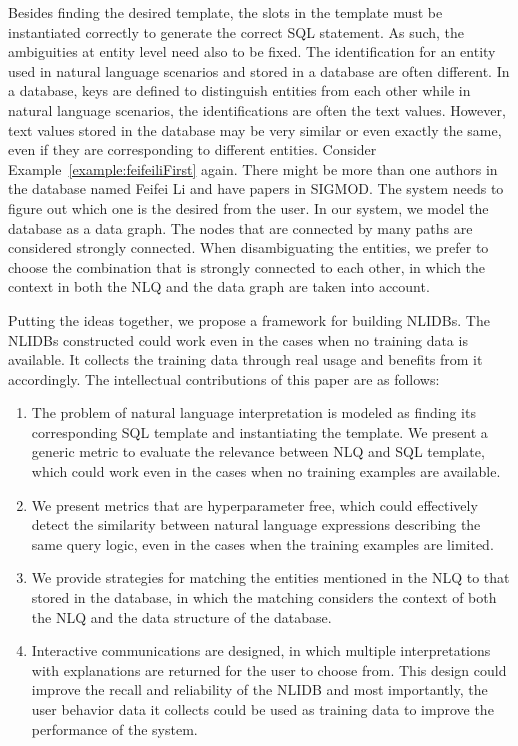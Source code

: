 \documentclass{vldb}
\begin{document}
Besides finding the desired template, the slots in the template must be instantiated correctly to generate the correct SQL statement. As such, the ambiguities at entity level need also to be fixed. The identification for an entity used in natural language scenarios and stored in a database are often different. In a database, keys are defined to distinguish entities from each other while in natural language scenarios, the identifications are often the text values. However, text values stored in the database may be very similar or even exactly the same, even if they are corresponding to different entities. Consider Example~\ref{example:feifeiliFirst} again.  There might be more than one authors in the database named Feifei Li and have papers in SIGMOD. The system needs to figure out which one is the desired from the user.  In our system, we model the database as a data graph. The nodes that are connected by many paths are considered strongly connected. When disambiguating the entities, we prefer to choose the combination that is strongly connected to each other, in which the context in both the NLQ and the data graph are taken into account. 

Putting the ideas together, we propose a framework for building NLIDBs.  The NLIDBs constructed could work even in the cases when no training data is available.  It collects the training data through real usage and benefits from it accordingly.  The intellectual contributions of this paper are as follows: 
\begin{enumerate}
  \item The problem of natural language interpretation is modeled as finding its corresponding SQL template and instantiating the template.  We present a generic metric to evaluate the relevance between NLQ and SQL template, which could work even in the cases when no training examples are available.  
   \item We present metrics that are hyperparameter free, which could effectively detect the similarity between natural language expressions describing the same query logic, even in the cases when the training examples are limited.  
  \item We provide strategies for matching the entities mentioned in the NLQ to that stored in the database, in which the matching considers the context of both the NLQ and the data structure of the database. 
  \item Interactive communications are designed, in which multiple interpretations with explanations are returned for the user to choose from.  This design could improve the recall and reliability of the NLIDB and most importantly, the user behavior data it collects could be used as training data to improve the performance of the system. 
\end{enumerate}
\end{document}
